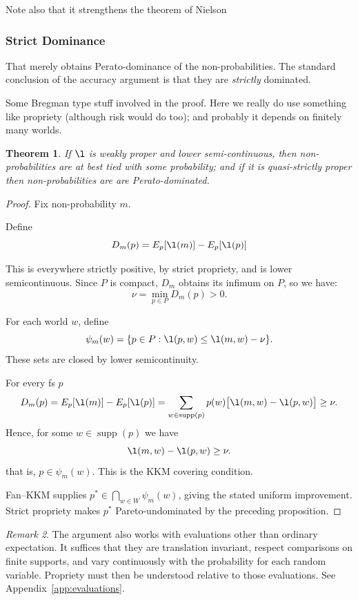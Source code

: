 \documentclass[11pt]{article}
\newtheorem{theorem}{Theorem}[section]
\theoremstyle{definition}
\theoremstyle{remark}
\newtheorem{remark}[theorem]{Remark}
\newcommand{\supp}{\operatorname{supp}}
\begin{document}
Note also that it strengthens the theorem of Nielson 

\subsubsection{Strict Dominance}
That merely obtains Perato-dominance of the non-probabilities. The standard conclusion of the accuracy argument is that they are \emph{strictly} dominated. 

Some Bregman type stuff involved in the proof. Here we really do use something like propriety (although risk would do too); and probably it depends on finitely many worlds. 

\begin{theorem}
	If $\l$ is weakly proper and lower semi-continuous, then non-probabilities are at best tied with some probability; and if it is quasi-strictly proper then non-probabilities are are Perato-dominated. 
\end{theorem}
\begin{proof}
	Fix non-probability $m$. 
	
	Define \[D_m(p)=E_p[\l(m)]-E_p[\l(p)]\]
	
	This is everywhere strictly positive, by strict propriety, and is lower semicontinuous.
	Since $P$ is compact, $D_m$ obtains its infimum on $P$, so we have: 
	\[
	\nu=\min_{p\in P}D_m(p)>0.
	\]
	
	For each world $w$, define
	\[
	\psi_m(w)=
	\{p\in P:\l(p,w)\le \l(m,w)-\nu\}.
	\]
	These sets are closed by lower semicontinuity.
	
	For every fs $p$
	\[D_m(p)=E_p[\l(m)]-E_p[\l(p)]=
	\sum_{w\in\supp(p)}
	p(w)\bigl[\l(m,w)-\l(p,w)\bigr]\ge\nu.
	\]
	Hence, for some $w\in\supp(p)$ we have \[\l(m,w)-\l(p,w)\ge\nu.
	\] that is, $p\in \psi_m(w)$. 
	This is the KKM covering condition.
	
	Fan--KKM supplies
	$p^*\in\bigcap_{w\in W}\psi_m(w)$,
	giving the stated uniform improvement.
	Strict propriety makes $p^*$ Pareto-undominated
	by the preceding proposition.
	
\end{proof}
	\begin{remark}
	The argument also works with evaluations other
	than ordinary expectation. It suffices that they
	are translation invariant, respect comparisons
	on finite supports, and vary continuously with
	the probability for each random variable. 
	Propriety must then be understood relative to
	those evaluations. See Appendix~\ref{app:evaluations}.
\end{remark}
\end{document}
